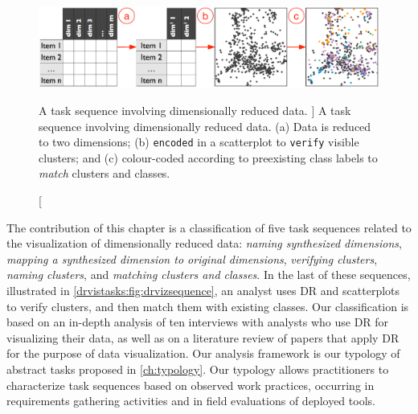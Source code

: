 \begin{figure}
	\centering
	\includegraphics[width=\textwidth]{figures/drvizsequence.eps}
	\caption
	[
	    A task sequence involving dimensionally reduced data.
	]
	{
    	A task sequence involving dimensionally reduced data. (a) Data is reduced to two dimensions; (b) {\tt encoded} in a scatterplot to {\tt verify} visible clusters; and (c) colour-coded according to preexisting class labels to \textsl{match} clusters and classes.
	}
	\centering
	\label{drvistasks:fig:drvizsequence}
\end{figure} 


The contribution of this chapter is a classification of five task sequences related to the visualization of dimensionally reduced data: {\it naming synthesized dimensions}, {\it mapping a synthesized dimension to original dimensions}, {\it verifying clusters}, {\it naming clusters}, and  {\it matching clusters and classes}. 
In the last of these sequences, illustrated in \autoref{drvistasks:fig:drvizsequence}, an analyst uses \ac{DR} and scatterplots to verify clusters, and then match them with existing classes.
Our classification is based on an in-depth analysis of ten interviews with analysts who use \ac{DR} for visualizing their data, as well as on a literature review of papers that apply \ac{DR} for the purpose of data visualization.
Our analysis framework is our typology of abstract tasks proposed in \autoref{ch:typology}.
Our typology allows practitioners to characterize task sequences based on observed work practices, occurring in requirements gathering activities and in field evaluations of deployed tools.


